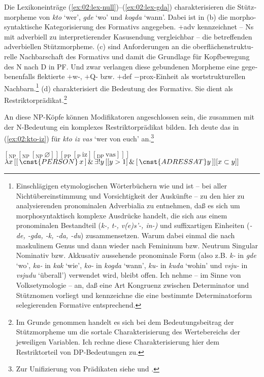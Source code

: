 \documentclass[output=paper, colorlinks, citecolor=brown, booklanguage=german]{langscibook}
\begin{document}
\begin{otherlanguage}{german}
\noindent Die Lexikoneinträge (\ref{ex:02:lex-null})--(\ref{ex:02:lex-gda}) charakterisieren die Stützmorpheme von \textit{kto} `wer', \textit{gde} `wo' und \textit{kogda} `wann'. Dabei ist in (b) die morphosyntaktische Kate\-go\-ri\-sie\-rung des Formativs angegeben. $+$adv kennzeichnet -- Ns mit adverbiell zu interpretierender Kasusendung vergleichbar -- die betreffenden adverbiellen Stützmorpheme. (c) sind Anforderungen an die oberflächenstrukturelle Nachbarschaft des Formativs und damit die Grundlage für Kopfbewegung des N nach D in PF. Und zwar verlangen diese gebundenen Morpheme eine gegebenenfalls flektierte $+$w-, $+$Q- bzw. $+$def $-$prox-Einheit als wortstrukturellen Nachbarn.\footnote{\label{fn:18} Einschlägigen etymologischen Wörterbüchern wie \citet{Preobrazenskij1958} und \citet{Vasmer1964} ist -- bei aller Nichtübereinstimmung und Vorsichtigkeit der Auskünfte -- zu den hier zu analysierenden pronominalen Adverbialia zu entnehmen, daß es sich um morphosyntaktisch komplexe Ausdrücke handelt, die sich aus einem pronominalen Bestandteil (\textit{k-, t-, v(e)s'-, \mbox{in-})} und suffixartigen Einheiten (\textit{-de, -gda, -k, -da, -du}) zusammensetzen. Warum dabei einmal die nach maskulinem Genus und dann wieder nach Femininum bzw. Neutrum Singular Nomi\-nativ bzw. Akkusativ aussehende pronominale Form (also z.B. \textit{k-} in \textit{gde} `wo', \textit{ka-} in \textit{kak} `wie', \textit{ko-} in \textit{kogda} `wann', \textit{ku-} in \textit{kuda} `wohin' und \textit{vsju-} in \textit{vsjudu} `überall') verwendet wird, bleibt offen. Ich nehme -- im Sinne von Volksetymologie -- an, daß eine Art Kongruenz zwischen Determinator und Stütznomen vorliegt und kennzeichne die eine bestimmte Determinatorform selegierenden Formative entsprechend.} (d) charakterisiert die Bedeutung des Formativs. Sie dient als Restriktorprädikat.\footnote{Im Grunde genommen handelt es sich bei dem Bedeutungsbeitrag der Stützmorpheme um die sortale Charakterisierung des Wertebereichs der jeweiligen Variablen. Ich rechne diese Charakterisierung hier dem Restriktorteil von DP-Bedeutungen zu.}

An diese NP-Köpfe können Modifikatoren angeschlossen sein, die zusammen mit der N-Bedeutung ein komplexes Restriktorprädikat bilden. Ich deute das in (\ref{ex:02:kto-iz}) für \textit{kto iz vas} `wer von euch' an.\footnote{Zur Unifizierung von Prädikaten siehe \citet{Zimmermann1992} und \citet{Wunderlich1997b}.}

\ea\label{ex:02:kto-iz}
    \ea $[_\textrm{NP}\, [_\textrm{NP}\, [_\textrm{NP}\, \varnothing ]][_\textrm{PP}\, [_\textrm{P}\, \textrm{iz} ][_\textrm{DP}\, \textrm{vas}]]]$
    \ex $\lambda x\, [[\,\cnst{PERSON}\, x\,]\, \& \, \exists!y\, [[ y > 1]\, \&\, [\,\cnst{ADRESSAT} y\, ]] [x \subset y ]]$
\z\z 


\end{otherlanguage}
\end{document}
